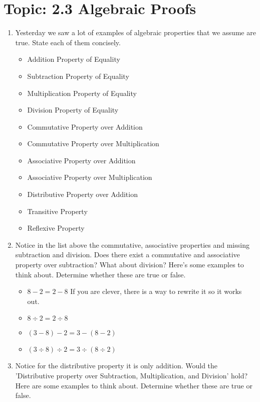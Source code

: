 \documentclass[12pt,letterpaper]{article}
\begin{document}
\section*{Topic: 2.3 Algebraic Proofs}
\begin{enumerate}
    \item Yesterday we saw a lot of examples of algebraic properties that we assume are true. State each of them concisely.
          \begin{itemize}
              \item Addition Property of Equality
              \item Subtraction Property of Equality
              \item Multiplication Property of Equality
              \item Division Property of Equality
              \item Commutative Property over Addition
              \item Commutative Property over Multiplication
              \item Associative Property over Addition
              \item Associative Property over Multiplication
              \item Distributive Property over Addition
              \item Transitive Property
              \item Reflexive Property
          \end{itemize}
    \item Notice in the list above the commutative, associative properties and missing subtraction and division. Does there exist a commutative and associative property over subtraction? What about division? Here's some examples to think about. Determine whether these are true or false.
          \begin{itemize}
              \item $8-2=2-8$ If you are clever, there is a way to rewrite it so it works out.
              \item $8\div2=2\div8$
              \item $(3-8)-2=3-(8-2)$
              \item $(3\div8)\div2=3\div(8\div2)$
          \end{itemize}
    \item Notice for the distributive property it is only addition. Would the 'Distributive property over Subtraction, Multiplication, and Division' hold? Here are some examples to think about. Determine whether these are true or false.

\end{enumerate}
\end{document}
